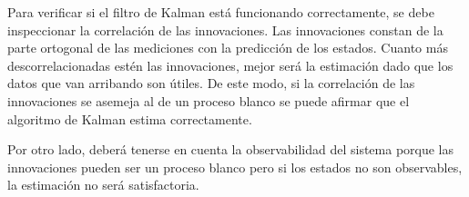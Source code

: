 	
	Para verificar si el filtro de Kalman está funcionando correctamente, se debe inspeccionar la correlación de las innovaciones. Las innovaciones constan de la parte ortogonal de las mediciones con la predicción de los estados. Cuanto más descorrelacionadas estén las innovaciones, mejor será la estimación dado que los datos que van arribando son útiles. De este modo, si la correlación de las innovaciones se asemeja al de un proceso blanco se puede afirmar que el algoritmo de Kalman estima correctamente.

	Por otro lado, deberá tenerse en cuenta la observabilidad del sistema porque las innovaciones pueden ser un proceso blanco pero si los estados no son observables, la estimación no será satisfactoria.
